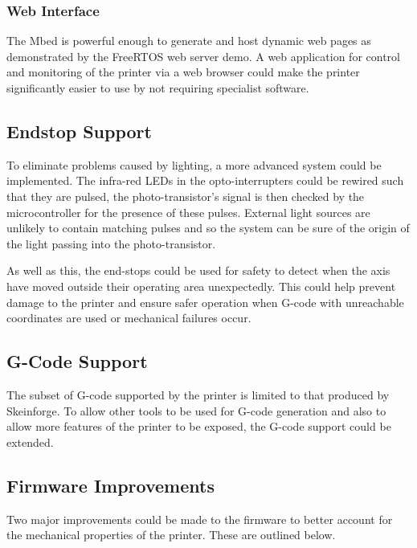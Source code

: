 			\subsubsection{Web Interface}
				
				The Mbed is powerful enough to generate and host dynamic web pages as
				demonstrated by the FreeRTOS web server demo. A web application for
				control and monitoring of the printer via a web browser could make the
				printer significantly easier to use by not requiring specialist
				software.
		
		\subsection{Endstop Support}
			
			\label{sec:future_endstop}
			
			To eliminate problems caused by lighting, a more advanced system could be
			implemented.  The infra-red LEDs in the opto-interrupters could be rewired
			such that they are pulsed, the photo-transistor's signal is then checked
			by the microcontroller for the presence of these pulses. External light
			sources are unlikely to contain matching pulses and so the system can be
			sure of the origin of the light passing into the photo-transistor.
			
			As well as this, the end-stops could be used for safety to detect when the
			axis have moved outside their operating area unexpectedly. This could help
			prevent damage to the printer and ensure safer operation when G-code with
			unreachable coordinates are used or mechanical failures occur.
			
		\subsection{G-Code Support}
			
			The subset of G-code supported by the printer is limited to that produced
			by Skeinforge. To allow other tools to be used for G-code generation and
			also to allow more features of the printer to be exposed, the G-code
			support could be extended.
		
		\subsection{Firmware Improvements}
			
			\label{sec:future_firmware}
			
			Two major improvements could be made to the firmware to better account for
			the mechanical properties of the printer. These are outlined below.
			
